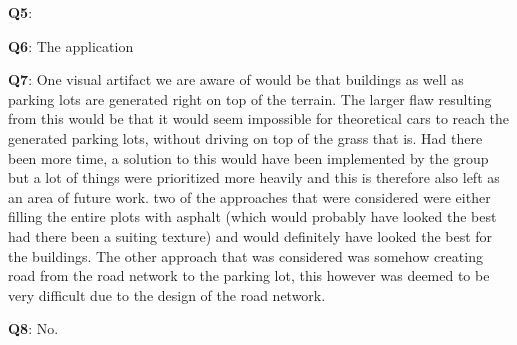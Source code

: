 \textbf{Q5}:

\textbf{Q6}:
The application 

\textbf{Q7}:
One visual artifact we are aware of would be that buildings as well as parking lots are generated right on top of the terrain.
The larger flaw resulting from this would be that it would seem impossible for theoretical cars to reach the generated parking lots, without driving on top of the grass that is.
Had there been more time, a solution to this would have been implemented by the group but a lot of things were prioritized more heavily and this is therefore also left as an area of future work. 
two of the approaches that were considered were either filling the entire plots with asphalt (which would probably have looked the best had there been a suiting texture) and would definitely have looked the best for the buildings.
The other approach that was considered was somehow creating road from the road network to the parking lot, this however was deemed to be very difficult due to the design of the road network. 

\textbf{Q8}: No.


